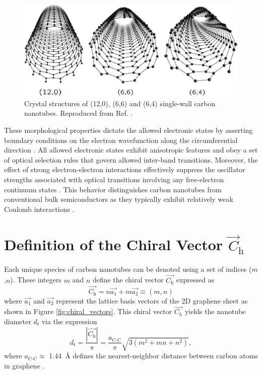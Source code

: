 \begin{figure}[h]
	\centering
	\includegraphics[scale=0.4]{images/chapter_optical_props/nanotube_symmetries_charlier}
	\caption{Crystal structures of (12,0), (6,6) and (6,4) single-wall carbon nanotubes. Reproduced from Ref. \cite{charlier2007electronic}.}
	\label{fig:symmetries}
\end{figure}
These morphological properties dictate the allowed electronic states by asserting boundary conditions on the electron wavefunction along the circumferential direction \cite{charlier2007electronic}. All allowed electronic states exhibit anisotropic features and obey a set of optical selection rules that govern allowed inter-band transitions. Moreover, the effect of strong electron-electron interactions effectively suppress the oscillator strengths associated with optical transitions involving any free-electron continuum states \cite{ando1997excitons}. This behavior distinguishes carbon nanotubes from conventional bulk semiconductors as they typically exhibit relatively weak Coulomb interactions \cite{ando1997excitons}.


\section{Definition of the Chiral Vector $\vec{C}_\text{h}$}

Each unique species of carbon nanotubes can be denoted using a set of indices ($m$,$n$). These integers $m$ and $n$ define the chiral vector $\vec{C_\text{h} }$ expressed as
\begin{equation}
	\vec{C_\text{h}} = n {\vec{a_\text{1}}} + m {\vec{a_2}} \equiv (m,n)
	\label{eq:chiral_vec}
\end{equation}
where $\vec{a_\text{1}}$ and $\vec{a_\text{2}}$ represent the lattice basis vectors of the 2D graphene sheet as shown in Figure \ref{fig:chiral_vectors}. This chiral vector $\vec{C_h}$ yields the nanotube diameter $d_t$ via the expression
\begin{equation}
	d_\text{t} = \dfrac{|\vec{C_\text{h}}|}{\pi} = \dfrac{a_\text{C-C}}{\pi}\sqrt{3(m^2 + mn + n^2)},
\end{equation}
where $a_\text{C-C} \approx$ \SI{1.44}{\angstrom} defines the nearest-neighbor distance between carbon atoms in graphene \cite{nanot2013single}.

